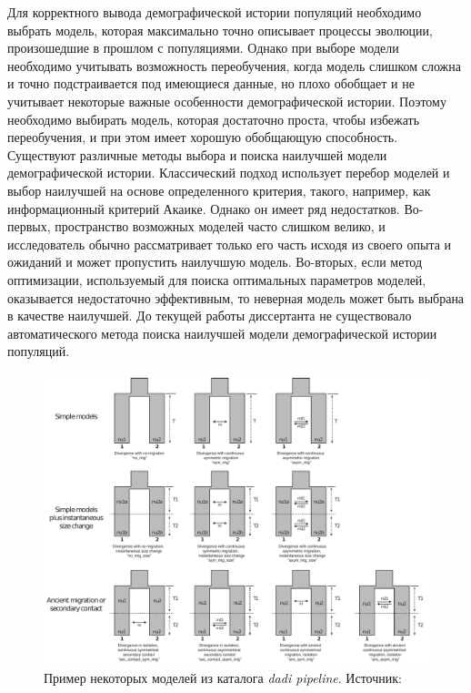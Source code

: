 Для корректного вывода демографической истории популяций необходимо выбрать модель, которая максимально точно описывает процессы эволюции, произошедшие в прошлом с популяциями.
Однако при выборе модели необходимо учитывать возможность переобучения, когда модель слишком сложна и точно подстраивается под имеющиеся данные, но плохо обобщает и не учитывает некоторые важные особенности демографической истории.
Поэтому необходимо выбирать модель, которая достаточно проста, чтобы избежать переобучения, и при этом имеет хорошую обобщающую способность.
Существуют различные методы выбора и поиска наилучшей модели демографической истории.
Классический подход использует перебор моделей и выбор наилучшей на основе определенного критерия, такого, например, как информационный критерий Акаике.
Однако он имеет ряд недостатков.
Во-первых, пространство возможных моделей часто слишком велико, и исследователь обычно рассматривает только его часть исходя из своего опыта и ожиданий и может пропустить наилучшую модель.
Во-вторых, если метод оптимизации, используемый для поиска оптимальных параметров моделей, оказывается недостаточно эффективным, то неверная модель может быть выбрана в качестве наилучшей.
До текущей работы диссертанта не существовало автоматического метода поиска наилучшей модели демографической истории популяций.

\begin{figure}
    \centering
    \includegraphics[width=\linewidth]{images/part1/model_selection/Models_2D.pdf}
    \caption{Пример некоторых моделей из каталога \textit{dadi pipeline}. Источник:~\cite{portik2017evaluating}}
    \label{fig:part1:model_selection:dadi_pipeline}
\end{figure}

